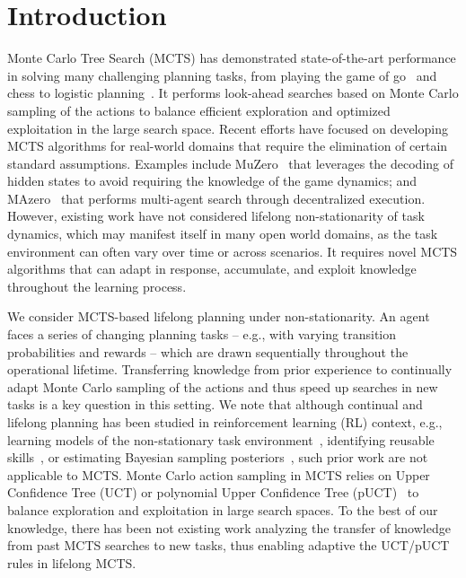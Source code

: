 \section{Introduction}
Monte Carlo Tree Search (MCTS) has demonstrated state-of-the-art performance in solving many challenging planning tasks, from playing the game of go~\cite{silver2016mastering} and chess to logistic planning~\cite{silver2017mastering}. It performs look-ahead searches based on Monte Carlo sampling of the actions to balance efficient exploration and optimized exploitation in the large search space. Recent efforts have focused on developing MCTS algorithms for real-world domains that require the elimination of certain standard assumptions. Examples include MuZero~\cite{schrittwieser2020mastering} that leverages the decoding of hidden states to avoid requiring the knowledge of the game dynamics; and MAzero~\cite{liu2024efficient} that performs multi-agent search through decentralized execution. However, existing work have not considered lifelong non-stationarity of task dynamics, which may manifest itself in many open world domains, as the task environment can often vary over time or across scenarios. It requires novel MCTS algorithms that can adapt in response, accumulate, and exploit knowledge throughout the learning process. 

We consider MCTS-based lifelong planning under non-stationarity. An agent faces a series of changing planning tasks -- e.g., with varying transition probabilities and rewards -- which are drawn sequentially throughout the operational lifetime. Transferring knowledge from prior experience to continually adapt Monte Carlo sampling of the actions and thus speed up searches in new tasks is a key question in this setting. We note that although continual and lifelong planning has been studied in reinforcement learning (RL) context, e.g., learning models of the non-stationary task environment~\cite{xie2020deep}, identifying reusable skills~\cite{lu2020reset}, or estimating Bayesian sampling posteriors~\cite{fu2022model}, such prior work are not applicable to MCTS. Monte Carlo action sampling in MCTS relies on Upper Confidence Tree (UCT) or polynomial Upper Confidence Tree (pUCT)~\cite{auger2013continuous,matsuzaki2018empirical} to balance exploration and exploitation in large search spaces. To the best of our knowledge, there has been not existing work analyzing the transfer of knowledge from past MCTS searches to new tasks, thus enabling adaptive the UCT/pUCT rules in lifelong MCTS.


